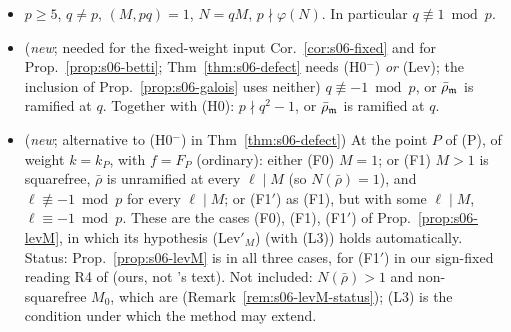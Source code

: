 \begin{hypothesis}\label{hyp:s06-H}
\leavevmode
\begin{itemize}
\item[(H0)] $p\ge5$, $q\ne p$, $(M,pq)=1$, $N=qM$, $p\nmid\varphi(N)$. In particular $q\not\equiv1\bmod p$.
\item[(H0$^-$)] (\emph{new}; needed for the fixed-weight input Cor.~\ref{cor:s06-fixed} and for Prop.~\ref{prop:s06-betti};
  Thm~\ref{thm:s06-defect} needs (H0$^-$) \emph{or} (Lev); the inclusion of Prop.~\ref{prop:s06-galois} uses neither)
  $q\not\equiv-1\bmod p$, or $\bar\rho_{\mathfrak{m}}$ is ramified at $q$. Together with (H0): $p\nmid q^2-1$, or $\bar\rho_{\mathfrak{m}}$ is ramified at $q$.
\item[(Lev)] (\emph{new}; alternative to (H0$^-$) in Thm~\ref{thm:s06-defect}) At the point $P$ of (P), of weight $k=k_P$, with
  $f=F_P$ (ordinary): either (F0) $M=1$; or (F1) $M>1$ is squarefree, $\bar\rho$ is unramified at every $\ell\mid M$ (so $N(\bar\rho)=1$),
  and $\ell\not\equiv-1\bmod p$ for every $\ell\mid M$; or (F1$'$) as (F1), but with some $\ell\mid M$, $\ell\equiv-1\bmod p$. These are the
  cases (F0), (F1), (F1$'$) of Prop.~\ref{prop:s06-levM}, in which its hypothesis (Lev$'_M$) (with (L3)) holds automatically. Status:
  Prop.~\ref{prop:s06-levM} is \stpmc{} in all three cases, for (F1$'$) in our sign-fixed reading R4 of \cite[Thm~3.14]{KO} (ours, not
  \cite{KO}'s text). Not included: $N(\bar\rho)>1$ and non-squarefree $M_0$, which are \stopen{} (Remark~\ref{rem:s06-levM-status}); (L3) is the condition under
  which the method may extend.


\end{itemize}
\end{hypothesis}
